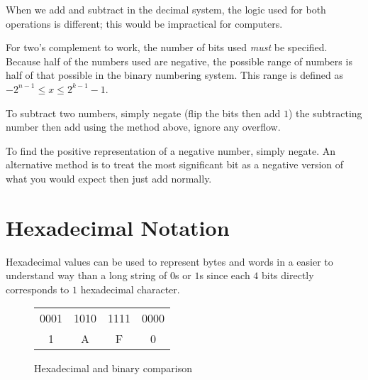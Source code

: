 When we add and subtract in the decimal system, the logic used for both operations is different; this would be impractical for computers.

For two's complement to work, the number of bits used \emph{must} be specified.
Because half of the numbers used are negative, the possible range of numbers is half of that possible in the binary numbering system.
This range is defined as \(-2^{n-1} \le x \le 2^{k-1} - 1\).

To subtract two numbers, simply negate (flip the bits then add \(1\)) the subtracting number then add using the method above, ignore any overflow.

To find the positive representation of a negative number, simply negate.
An alternative method is to treat the most significant bit as a negative version of what you would expect then just add normally.

\section{Hexadecimal Notation}\label{sec:hexadecimal_notation}

Hexadecimal values can be used to represent bytes and words in a easier to understand way than a long string of \(0\)s or \(1\)s since each \(4\) bits directly corresponds to \(1\) hexadecimal character.

\begin{figure}[H]
	\centering
	\begin{tabular}{c|c|c|c}
		0001 & 1010 & 1111 & 0000 \\
		1    & A    & F    & 0
	\end{tabular}
	\label{tbl:hex_bin_comparison}
	\caption{Hexadecimal and binary comparison}
\end{figure}


